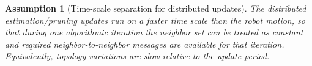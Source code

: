 \documentclass[conference]{IEEEconf}
\theoremstyle{plain}
\newtheorem{assumption}{Assumption}
\begin{document}
\begin{assumption}[Time-scale separation for distributed updates]
\label{ass:A4}
The distributed estimation/pruning updates run on a faster time scale than the robot motion, so that during one
algorithmic iteration the neighbor set can be treated as constant and required neighbor-to-neighbor messages are
available for that iteration. Equivalently, topology variations are slow relative to the update period.
\end{assumption}



\end{document}
